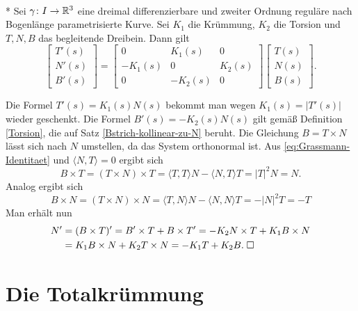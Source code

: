 \begin{theorem}%
\mbox{}\\*
Sei $\gamma\colon I\to\mathbb R^3$ eine dreimal differenzierbare und zweiter
Ordnung reguläre nach Bogenlänge parametrisierte Kurve.
Sei $K_1$ die Krümmung, $K_2$ die Torsion und $T,N,B$ das begleitende
Dreibein. Dann gilt%
\begin{equation}
\begin{bmatrix}
T'(s)\\ N'(s)\\ B'(s)
\end{bmatrix}
= \begin{bmatrix}
0 & K_1(s) & 0\\
-K_1(s) & 0 & K_2(s)\\
0 & -K_2(s) & 0
\end{bmatrix}
\begin{bmatrix}
T(s)\\ N(s)\\ B(s)
\end{bmatrix}.
\end{equation}
\end{theorem}

\noindent{}
Die Formel $T'(s)=K_1(s)N(s)$ bekommt man wegen $K_1(s)=|T'(s)|$
wieder geschenkt. Die Formel $B'(s)=-K_2(s)N(s)$ gilt gemäß
Definition \ref{Torsion}, die auf Satz \ref{Bstrich-kollinear-zu-N}
beruht. Die Gleichung $B=T\times N$ lässt sich nach $N$ umstellen,
da das System orthonormal ist. Aus \eqref{eq:Grassmann-Identitaet}
und $\langle N,T\rangle=0$ ergibt sich
\begin{equation}
B\times T = (T\times N)\times T
= \langle T,T\rangle N - \langle N,T\rangle T
= |T|^2 N = N.
\end{equation}
Analog ergibt sich
\begin{equation}
B\times N = (T\times N)\times N
= \langle T,N\rangle N - \langle N,N\rangle T
= -|N|^2 T = -T
\end{equation}
Man erhält nun
\begin{align}
N' &= (B\times T)' = B'\times T+B\times T'
= -K_2 N\times T+K_1 B\times N\\
&= K_1 B\times N+K_2 T\times N
= -K_1 T + K_2 B.\;\Box
\end{align}

\section{Die Totalkrümmung}

